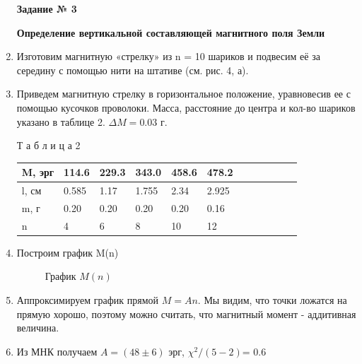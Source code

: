 \documentclass[a4paper, 12pt]{article}
\begin{document}
\begin{enumerate}
\textbf{Задание  № 3}

\textbf{Определение вертикальной составляющей магнитного поля Земли}
 \item
 Изготовим магнитную «стрелку» из n = 10 шариков и подвесим её за середину с помощью нити на штативе (см. рис. 4, а).
 \item
 Приведем магнитную стрелку в горизонтальное положение, уравновесив ее с помощью кусочков проволоки. Масса, расстояние до центра и кол-во шариков указано в таблице 2. $\Delta M = 0.03$ г.
 
 Т а б л и ц а 2
\newline

 \begin{tabular}{|l|l|l|l|l|l|l|l|l|l|l|l|}
\hline

M, эрг & 114.6 & 229.3 & 343.0 & 458.6 & 478.2 \\ \hline
l, см & 0.585 & 1.17 & 1.755 & 2.34 & 2.925 \\ \hline
m, г & 0.20 & 0.20 & 0.20 & 0.20 & 0.16 \\ \hline
n & 4 & 6 & 8 & 10 & 12 \\ \hline

\end{tabular}

\item 
Построим график M(n)

\begin{figure}[h]
\caption{График $M(n)$}
\label{ris:image}
\end{figure}
\item

Аппроксимируем график прямой $M = A n$. Мы видим, что точки ложатся на прямую хорошо, поэтому можно считать, что магнитный момент - аддитивная величина.
\item

Из МНК получаем $A = (48\pm6)$ эрг, $\chi^2/(5-2) $= 0.6


\end{enumerate}
\end{document}
